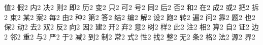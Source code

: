 {{值}{{}}{2}
{假}{{}}{2}
{内}{{}}{2}
{决}{{}}{2}
{则}{{}}{2}
{即}{{}}{2}
{历}{{}}{2}
{变}{{}}{2}
{只}{{}}{2}
{可}{{}}{2}
{号}{{}}{2}
{同}{{}}{2}
{后}{{}}{2}
{否}{{}}{2}
{和}{{}}{2}
{在}{{}}{2}
{成}{{}}{2}
{或}{{}}{2}
{把}{{}}{2}
{拆}{{}}{2}
{束}{{}}{2}
{某}{{}}{2}
{案}{{}}{2}
{每}{{}}{2}
{由}{{}}{2}
{种}{{}}{2}
{第}{{}}{2}
{答}{{}}{2}
{结}{{}}{2}
{编}{{}}{2}
{解}{{}}{2}
{设}{{}}{2}
{跑}{{}}{2}
{转}{{}}{2}
{遍}{{}}{2}
{问}{{}}{2}
{靠}{{}}{2}
{题}{{}}{2}
{也}{{}}{2}
{保}{{}}{2}
{动}{{}}{2}
{去}{{}}{2}
{双}{{}}{2}
{反}{{}}{2}
{向}{{}}{2}
{因}{{}}{2}
{建}{{}}{2}
{开}{{}}{2}
{弃}{{}}{2}
{意}{{}}{2}
{树}{{}}{2}
{样}{{}}{2}
{此}{{}}{2}
{注}{{}}{2}
{相}{{}}{2}
{算}{{}}{2}
{自}{{}}{2}
{证}{{}}{2}
{边}{{}}{2}
{邻}{{}}{2}
{重}{{}}{2}
{与}{{}}{2}
{严}{{}}{2}
{于}{{}}{2}
{减}{{}}{2}
{到}{{}}{2}
{制}{{}}{2}
{常}{{}}{2}
{式}{{}}{2}
{性}{{}}{2}
{找}{{}}{2}
{整}{{}}{2}
{无}{{}}{2}
{条}{{}}{2}
{格}{{}}{2}
{法}{{}}{2}
{源}{{}}{2}
{界}{{}}{2}
}
